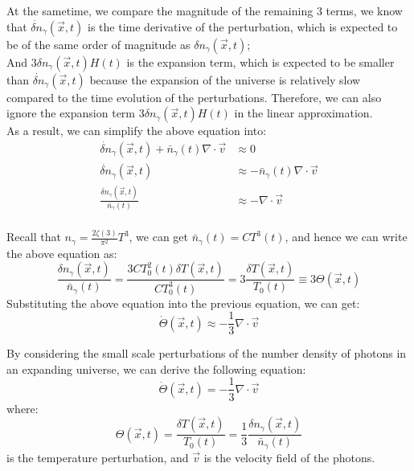 \begin{foundation}
    At the sametime, we compare the magnitude of the remaining 3 terms, we know that $\dot{\delta n}_\gamma(\vec{x},t)$ is the time derivative of the perturbation, which is expected to be of the same order of magnitude as $\delta n_\gamma(\vec{x},t)$; \\
    And $3 \delta n_\gamma(\vec{x},t) H(t)$ is the expansion term, which is expected to be smaller than $\dot{\delta n}_\gamma(\vec{x},t)$ because the expansion of the universe is relatively slow compared to the time evolution of the perturbations. Therefore, we can also ignore the expansion term $3 \delta n_\gamma(\vec{x},t) H(t)$ in the linear approximation. \\

    As a result, we can simplify the above equation into:
    \begin{align*}
        \dot{\delta n}_\gamma(\vec{x},t) + \bar{n}_\gamma(t) \nabla \cdot \vec{v} &\approx 0 \\
        \dot{\delta n}_\gamma(\vec{x},t) &\approx - \bar{n}_\gamma(t) \nabla \cdot \vec{v} \\
        \frac{\dot{\delta n}_\gamma(\vec{x},t)}{\bar{n}_\gamma(t)} &\approx - \nabla \cdot \vec{v}
    \end{align*} \\

    Recall that $n_\gamma = \frac{2 \zeta(3)}{\pi^2} T^3$, we can get $\bar{n}_\gamma(t) = C T^3(t)$, and hence we can write the above equation as:
    \[
        \frac{\delta n_\gamma(\vec{x},t)}{\bar{n}_\gamma(t)} = \frac{3C T_0^2(t) \delta T(\vec{x},t)}{C T_0^3(t)} = 3 \frac{\delta T(\vec{x},t)}{T_0(t)} \equiv 3 \Theta(\vec{x},t)
    \]
    Substituting the above equation into the previous equation, we can get:
    \[
        \dot{\Theta}(\vec{x},t) \approx - \frac{1}{3} \nabla \cdot \vec{v}
    \]  
\end{foundation}

\bigskip \noindent
\begin{theory}
    By considering the small scale perturbations of the number density of photons in an expanding universe, we can derive the following equation:
    \[
        \dot{\Theta}(\vec{x},t) = - \frac{1}{3} \nabla \cdot \vec{v}
    \]
    where:\[
        \Theta(\vec{x},t) = \frac{\delta T(\vec{x},t)}{T_0(t)} = \frac{1}{3} \frac{\delta n_\gamma(\vec{x},t)}{\bar{n}_\gamma(t)}
    \]
    is the temperature perturbation, and $\vec{v}$ is the velocity field of the photons. 
\end{theory}

